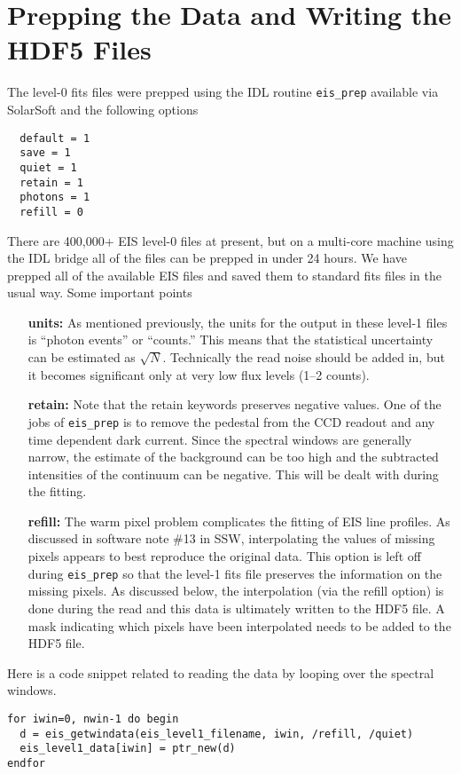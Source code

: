 
\chapter{Prepping the Data and Writing the HDF5 Files}

The level-0 fits files were prepped using the IDL routine \verb+eis_prep+ available via SolarSoft
\citep{Freeland:1998} and the following options
\begin{verbatim}
  default = 1
  save = 1
  quiet = 1
  retain = 1
  photons = 1
  refill = 0
\end{verbatim}
There are 400,000+ EIS level-0 files at present, but on a multi-core machine using the IDL bridge
all of the files can be prepped in under 24 hours. We have prepped all of the available EIS files
and saved them to standard fits files in the usual way. Some important points
\begin{enumerate}
  
\item[\bf units:] As mentioned previously, the units for the output in these level-1 files is
  ``photon events'' or ``counts.''  This means that the statistical uncertainty can be estimated as
  $\sqrt{N}$. Technically the read noise should be added in, but it becomes significant only at
  very low flux levels (1--2 counts).

\item[\bf retain:] Note that the retain keywords preserves negative values. One of the jobs of
  \verb+eis_prep+ is to remove the pedestal from the CCD readout and any time dependent dark
  current. Since the spectral windows are generally narrow, the estimate of the background can be
  too high and the subtracted intensities of the continuum can be negative. This will be dealt with
  during the fitting.

\item[\bf refill:] The warm pixel problem complicates the fitting of EIS line profiles. As
  discussed in software note \#13 in SSW, interpolating the values of missing pixels appears to
  best reproduce the original data. This option is left off during \verb+eis_prep+ so that the
  level-1 fits file preserves the information on the missing pixels. As discussed below, the
  interpolation (via the refill option) is done during the read and this data is ultimately written
  to the HDF5 file. A mask indicating which pixels have been interpolated needs to be added to the
  HDF5 file.
  
\end{enumerate}
Here is a code snippet related to reading the data by looping over the spectral windows.
\begin{lstlisting}[language=idl]
for iwin=0, nwin-1 do begin
  d = eis_getwindata(eis_level1_filename, iwin, /refill, /quiet)
  eis_level1_data[iwin] = ptr_new(d)
endfor
\end{lstlisting}

